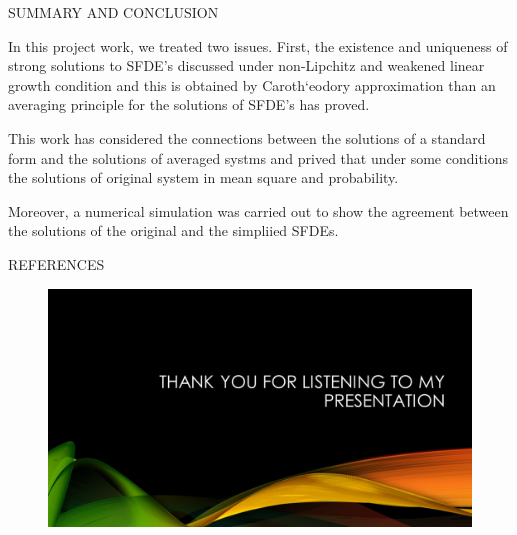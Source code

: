 \documentclass[unknownkeysallowed, compress]{beamer}
\theoremstyle{plain}
\begin{document}
\begin{frame}{SUMMARY AND CONCLUSION}
\noindent
\par In this project work, we treated two issues. First, the existence and uniqueness of strong solutions to SFDE's discussed under non-Lipchitz and weakened linear growth condition and this is obtained by Caroth`eodory approximation than an averaging principle for the solutions of SFDE's has proved.
\par This work has considered the connections between the solutions of a standard form and the solutions of averaged systms and prived that under some conditions the solutions of original system in mean square and probability.\\

\par Moreover, a numerical simulation was carried out to show the agreement between the solutions of the original and the simpliied SFDEs.











\end{frame}



















\begin{frame}[allowframebreaks]{REFERENCES}

\nocite{*}

\end{frame}
\begin{frame}
   \begin{figure}[hp]
	\centering
		\includegraphics[width=1.00\textwidth]{image2.jpg}
\end{figure}
\end{frame}
\end{document}
